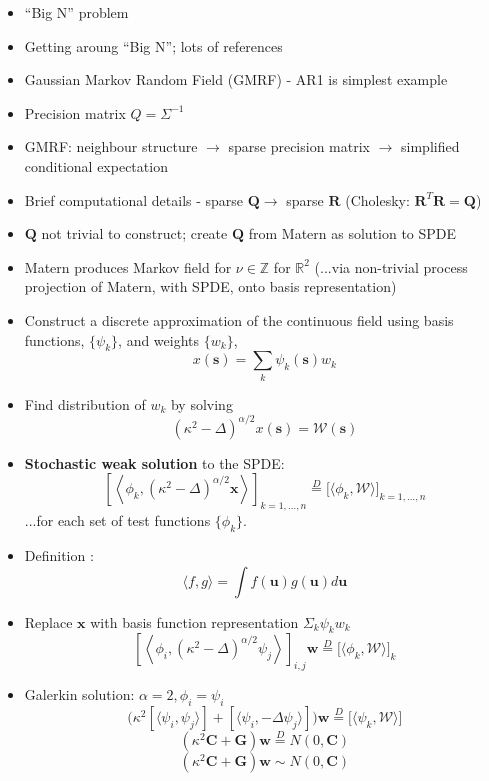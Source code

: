 \documentclass{article}
\begin{document}
\begin{itemize}
\item ``Big N'' problem
\item Getting aroung ``Big N''; lots of references
\item Gaussian Markov Random Field (GMRF) - AR1 is simplest example
\item Precision matrix $Q = \Sigma^{-1}$
\item GMRF: neighbour structure $\rightarrow$ sparse precision matrix $\rightarrow$ simplified conditional expectation
\item Brief computational details - sparse $\pmb{Q} \rightarrow$ sparse $\pmb{R}$ (Cholesky: $\pmb{R}^{T}\pmb{R} = \pmb{Q}$)
\item $\pmb{Q}$ not trivial to construct; create $\pmb{Q}$ from Matern as solution to SPDE
\item Matern produces  Markov field for $\nu \in \mathbb{Z}$ for $\mathbb{R}^{2}$ (...via non-trivial process projection of Matern, with SPDE, onto basis representation)
\item Construct a discrete approximation of the continuous field using basis functions, $\{\psi_{k} \}$, and weights $\{ w_{k} \}$,
$$ x(\pmb{s}) = \sum_{k} \psi_{k}(\pmb{s}) w_{k} $$
\item Find distribution of $w_{k}$ by solving
$$ (\kappa^{2} - \Delta)^{\alpha/2}x(\pmb{s}) = \mathcal{W}(\pmb{s})$$
\item {\bf Stochastic weak solution} to the SPDE:
      $$ \left[ \left< \phi_{k}, (\kappa^{2} - \Delta)^{\alpha/2} \pmb{x} \right> \right]_{k = 1, \hdots, n} \overset{D}{=} \Big[ \langle \phi_{k}, \mathcal{W} \rangle \Big]_{k = 1, \hdots, n} $$
      ...for each set of test functions $\{\phi_{k}\}$.
\item Definition \citep{Lindgren2011}:
$$ \langle f, g \rangle = \int f(\pmb{u}) g(\pmb{u}) d\pmb{u} $$
\item Replace $\pmb{x}$ with basis function representation $\Sigma_{k}\psi_{k}w_{k}$
$$ \left[ \left< \phi_{i}, (\kappa^{2} - \Delta)^{\alpha/2} \psi_{j} \right> \right]_{i,j}\pmb{w} \overset{D}{=} \Big[ \langle \phi_{k}, \mathcal{W} \rangle \Big]_{k} $$
\item Galerkin solution: $\alpha = 2, \phi_{i} = \psi_{i}$
$$ \Big(
\kappa^{2} [ \langle \psi_{i}, \psi_{j} \rangle ] + [ \langle \psi_{i}, -\Delta \psi_{j} \rangle ]
\Big) \pmb{w} \overset{D}{=} \Big[ \langle \psi_{k}, \mathcal{W} \rangle \Big] $$
$$ \left(
\kappa^{2} \pmb{C} + \pmb{G} \right) \pmb{w} \overset{D}{=} N(0,\pmb{C}) $$
$$ \left(
\kappa^{2} \pmb{C} + \pmb{G} \right) \pmb{w} \sim N(0,\pmb{C}) $$


\end{itemize}
\end{document}
